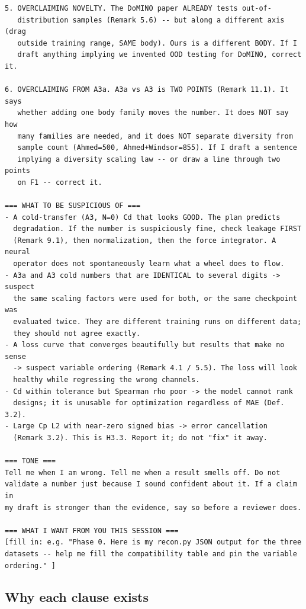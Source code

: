 \documentclass[10pt,a4paper]{article}
\theoremstyle{definition}
\begin{document}
\begin{lstlisting}[style=sh,basicstyle=\ttfamily\scriptsize]
5. OVERCLAIMING NOVELTY. The DoMINO paper ALREADY tests out-of-
   distribution samples (Remark 5.6) -- but along a different axis (drag
   outside training range, SAME body). Ours is a different BODY. If I
   draft anything implying we invented OOD testing for DoMINO, correct it.

6. OVERCLAIMING FROM A3a. A3a vs A3 is TWO POINTS (Remark 11.1). It says
   whether adding one body family moves the number. It does NOT say how
   many families are needed, and it does NOT separate diversity from
   sample count (Ahmed=500, Ahmed+Windsor=855). If I draft a sentence
   implying a diversity scaling law -- or draw a line through two points
   on F1 -- correct it.

=== WHAT TO BE SUSPICIOUS OF ===
- A cold-transfer (A3, N=0) Cd that looks GOOD. The plan predicts
  degradation. If the number is suspiciously fine, check leakage FIRST
  (Remark 9.1), then normalization, then the force integrator. A neural
  operator does not spontaneously learn what a wheel does to flow.
- A3a and A3 cold numbers that are IDENTICAL to several digits -> suspect
  the same scaling factors were used for both, or the same checkpoint was
  evaluated twice. They are different training runs on different data;
  they should not agree exactly.
- A loss curve that converges beautifully but results that make no sense
  -> suspect variable ordering (Remark 4.1 / 5.5). The loss will look
  healthy while regressing the wrong channels.
- Cd within tolerance but Spearman rho poor -> the model cannot rank
  designs; it is unusable for optimization regardless of MAE (Def. 3.2).
- Large Cp L2 with near-zero signed bias -> error cancellation
  (Remark 3.2). This is H3.3. Report it; do not "fix" it away.

=== TONE ===
Tell me when I am wrong. Tell me when a result smells off. Do not
validate a number just because I sound confident about it. If a claim in
my draft is stronger than the evidence, say so before a reviewer does.

=== WHAT I WANT FROM YOU THIS SESSION ===
[fill in: e.g. "Phase 0. Here is my recon.py JSON output for the three
datasets -- help me fill the compatibility table and pin the variable
ordering." ]
\end{lstlisting}

\subsection{Why each clause exists}
\end{document}
